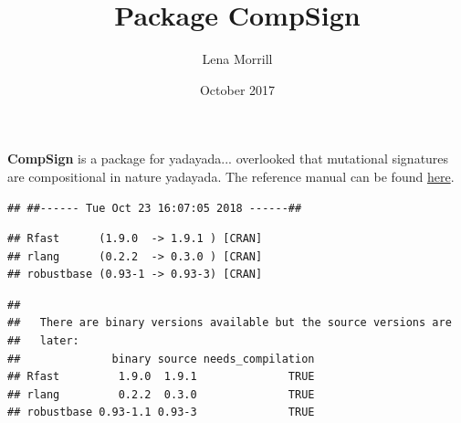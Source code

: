 \documentclass{article}
\title{Package \textbf{CompSign}}
\author{Lena Morrill}
\date{October 2017}
\begin{document}
\maketitle

\textbf{CompSign} is a package for yadayada... overlooked that mutational signatures are compositional in nature yadayada. The reference manual can be found \href{https://github.com/lm687/CompSign/blob/master/CompSign.pdf}{here}.

\begin{knitrout}
\color{fgcolor}\begin{kframe}
\begin{alltt}
\hlopt{::}\hlopt{$}\hlstd{(} \hlstd{=} \hlstd{)}
\end{alltt}
\end{kframe}
\end{knitrout}

\begin{knitrout}
\color{fgcolor}\begin{kframe}
\begin{alltt}
\hlstd{()}
\end{alltt}
\begin{verbatim}
## ##------ Tue Oct 23 16:07:05 2018 ------##
\end{verbatim}
\begin{alltt}
\hlopt{::}\hlstd{(}\hlstd{)}
\end{alltt}


{\ttfamily\noindent\itshape\color{messagecolor}{\#\# Downloading GitHub repo lm687/CompSign@master}}\begin{verbatim}
## Rfast      (1.9.0  -> 1.9.1 ) [CRAN]
## rlang      (0.2.2  -> 0.3.0 ) [CRAN]
## robustbase (0.93-1 -> 0.93-3) [CRAN]
\end{verbatim}


{\ttfamily\noindent\itshape\color{messagecolor}{\#\# Installing 3 packages: Rfast, rlang, robustbase}}\begin{verbatim}
## 
##   There are binary versions available but the source versions are
##   later:
##              binary source needs_compilation
## Rfast         1.9.0  1.9.1              TRUE
## rlang         0.2.2  0.3.0              TRUE
## robustbase 0.93-1.1 0.93-3              TRUE
\end{verbatim}


{\ttfamily\noindent\itshape\color{messagecolor}{\#\# installing the source packages 'Rfast', 'rlang', 'robustbase'}}

{\ttfamily\noindent\bfseries\color{errorcolor}{\#\# Error in i.p(...): (converted from warning) installation of package 'Rfast' had non-zero exit status}}\begin{alltt}
\end{alltt}
\end{kframe}
\end{knitrout}
\end{document}
